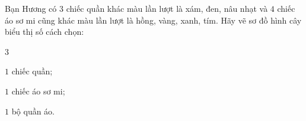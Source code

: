 \begin{vd}%
	Bạn Hương có $ 3 $ chiếc quần khác màu lần lượt là xám, đen, nâu nhạt và $ 4 $ chiếc áo sơ mi cũng khác màu lần lượt là hồng, vàng, xanh, tím. Hãy vẽ sơ đồ hình cây biểu thị số cách chọn:
	\begin{enumEX}{3}
		\item $ 1 $ chiếc quần;
		\item $ 1 $ chiếc áo sơ mi;
		\item $ 1 $ bộ quần áo.
	\end{enumEX}
\end{vd}
